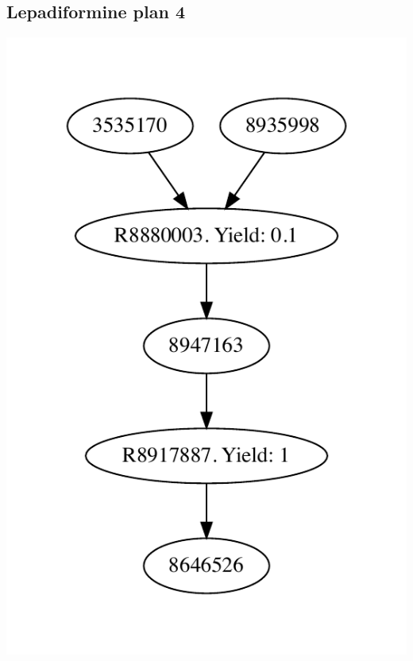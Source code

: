 \documentclass[a4paper,10pt,titlepage]{paper}
\begin{document}
\subsection{Lepadiformine plan 4}
\centering
\includegraphics[scale=0.4]{Synteseplaner/Lepadiformine/plan4.pdf}
\label{Appendix::Lepadiformine4}
\end{document}
